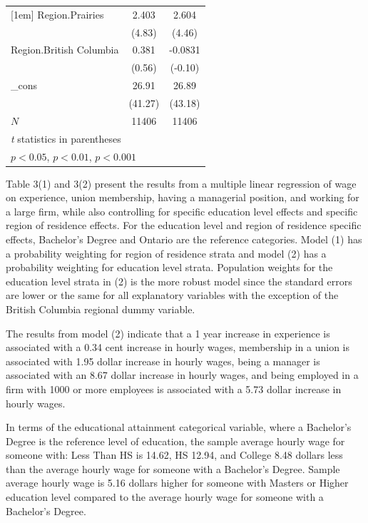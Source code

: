 \documentclass[11pt]{article}
\begin{document}
{\begin{table}[!ht]
\begin{tabular}{l*{2}{c}}
[1em]
Region.Prairies    &       2.403\sym{***}&       2.604\sym{***}\\
            &      (4.83)         &      (4.46)         \\
[1em]
Region.British Columbia    &       0.381         &     -0.0831         \\
            &      (0.56)         &     (-0.10)         \\
[1em]
\_cons      &       26.91\sym{***}&       26.89\sym{***}\\
            &     (41.27)         &     (43.18)         \\
\hline
\(N\)       &       11406         &       11406         \\
\hline\hline
\multicolumn{3}{l}{\footnotesize \textit{t} statistics in parentheses}\\
\multicolumn{3}{l}{\footnotesize \sym{*} \(p<0.05\), \sym{**} \(p<0.01\), \sym{***} \(p<0.001\)}\\
\end{tabular}
\end{table}
}

Table 3(1) and 3(2) present the results from a multiple linear regression of wage on experience, union membership, having a managerial position, and working for a large firm, while also controlling for specific education level effects and specific region of residence effects. For the education level and region of residence specific effects, Bachelor's Degree and Ontario are the reference categories. Model (1) has a probability weighting for region of residence strata and model (2) has a probability weighting for education level strata. Population weights for the education level strata in (2) is the more robust model since the standard errors are lower or the same for all explanatory variables with the exception of the British Columbia regional dummy variable. 

The results from model (2) indicate that a 1 year increase in experience is associated with a 0.34 cent increase in hourly wages, membership in a union is associated with 1.95 dollar increase in hourly wages, being a manager is associated with an 8.67 dollar increase in hourly wages, and being employed in a firm with 1000 or more employees is associated with a 5.73 dollar increase in hourly wages. 

In terms of the educational attainment categorical variable, where a Bachelor's Degree is the reference level of education, the sample average hourly wage for someone with: Less Than HS is 14.62, HS 12.94, and College 8.48 dollars less than the average hourly wage for someone with a Bachelor's Degree. Sample average hourly wage is 5.16 dollars higher for someone with Masters or Higher education level compared to the average hourly wage for someone with a Bachelor's Degree.
\end{document}
